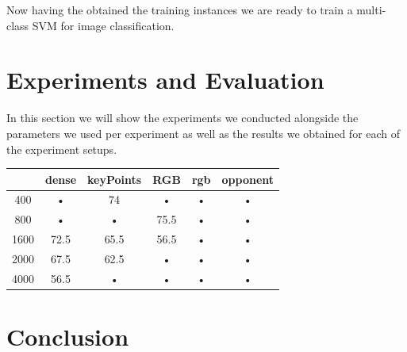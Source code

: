 \documentclass[11pt]{article}
\begin{document}
Now having the obtained the training instances we are ready to train a multi-class SVM for image classification.

\section{Experiments and Evaluation}
In this section we will show the experiments we conducted alongside the parameters we used per experiment as well as the results we obtained for each of the experiment setups.

\begin{table}
\begin{tabular}{c|ccccc}
 & dense & keyPoints & RGB & rgb & opponent \\ 
\hline 
400 & • & 74 & • & • & • \\ 
800 & • & • & 75.5 & • & • \\ 
1600 & 72.5 & 65.5 & 56.5 & • & • \\ 
2000 & 67.5 & 62.5 & • & • & • \\ 
4000 & 56.5 & • & • & • & • \\ 
\end{tabular}
\label{Accuracy of the different models}
\end{table}

\section{Conclusion}

{}

\end{document}
